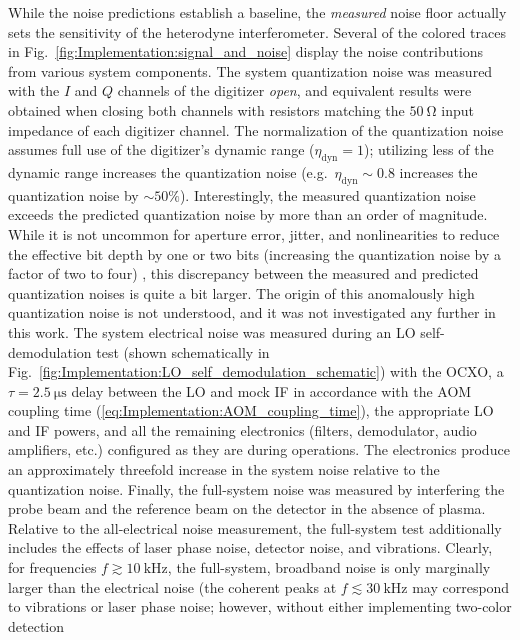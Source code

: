 While the noise predictions establish a baseline,
the \emph{measured} noise floor actually sets the sensitivity
of the heterodyne interferometer.
Several of the colored traces in
Fig.~\ref{fig:Implementation:signal_and_noise}
display the noise contributions from various system components.
The system quantization noise was measured
with the $I$ and $Q$ channels of the digitizer \emph{open}, and
equivalent results were obtained when closing both channels with
resistors matching the $\SI{50}{\ohm}$ input impedance
of each digitizer channel.
The normalization of the quantization noise assumes
full use of the digitizer's dynamic range ($\eta_{\text{dyn}} = 1$);
utilizing less of the dynamic range increases the quantization noise
(e.g.\ $\eta_{\text{dyn}} \sim 0.8$
increases the quantization noise by $\sim 50\%$).
Interestingly, the measured quantization noise
exceeds the predicted quantization noise
by more than an order of magnitude.
While it is not uncommon for aperture error, jitter, and nonlinearities
to reduce the effective bit depth by one or two bits
(increasing the quantization noise by a factor of two to four)
\cite[Sec.~10.2.4]{bendat_and_piersol},
this discrepancy between the measured and predicted quantization noises
is quite a bit larger.
The origin of this anomalously high quantization noise is not understood, and
it was not investigated any further in this work.
The system electrical noise was measured
during an LO self-demodulation test
(shown schematically in
Fig.~\ref{fig:Implementation:LO_self_demodulation_schematic})
with the OCXO,
a $\tau = \SI{2.5}{\micro\second}$ delay between the LO and mock IF
in accordance with the AOM coupling time
(\ref{eq:Implementation:AOM_coupling_time}),
the appropriate LO and IF powers, and
all the remaining electronics (filters, demodulator, audio amplifiers, etc.)
configured as they are during operations.
The electronics produce an approximately threefold increase
in the system noise relative to the quantization noise.
Finally, the full-system noise was measured
by interfering the probe beam and the reference beam
on the detector in the absence of plasma.
Relative to the all-electrical noise measurement,
the full-system test additionally includes the effects of
laser phase noise, detector noise, and vibrations.
Clearly, for frequencies $f \gtrsim \SI{10}{\kilo\hertz}$,
the full-system, broadband noise is only marginally larger
than the electrical noise
(the coherent peaks at $f \lesssim \SI{30}{\kilo\hertz}$
may correspond to vibrations or laser phase noise;
however, without either implementing two-color detection
